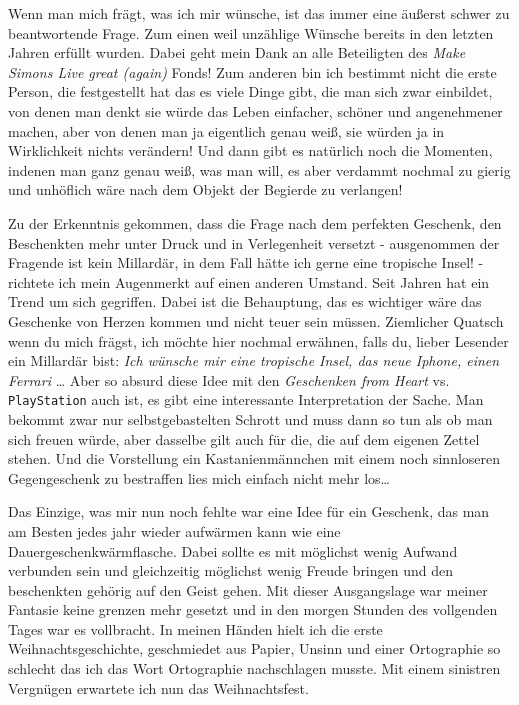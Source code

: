 \documentclass[11pt]{article}
\begin{document}
\noindent Wenn man mich frägt, was ich mir wünsche, ist das immer eine
äußerst schwer zu beantwortende Frage. Zum einen weil unzählige
Wünsche bereits in den letzten Jahren erfüllt wurden. Dabei geht mein
Dank an alle Beteiligten des \emph{Make Simons Live great (again)} Fonds!
Zum anderen bin ich bestimmt nicht die erste Person, die festgestellt
hat das es viele Dinge gibt, die man sich zwar einbildet, von denen
man denkt sie würde das Leben einfacher, schöner und angenehmener
machen, aber von denen man ja eigentlich genau weiß, sie würden ja in
Wirklichkeit nichts verändern! Und dann gibt es natürlich noch die
Momenten, indenen man ganz genau weiß, was man will, es aber
verdammt nochmal zu gierig und unhöflich wäre nach dem Objekt der
Begierde zu verlangen! \newline

\noindent Zu der Erkenntnis gekommen, dass die Frage nach dem
perfekten Geschenk, den Beschenkten mehr unter Druck und in
Verlegenheit versetzt - ausgenommen der Fragende ist kein Millardär,
in dem Fall hätte ich gerne eine tropische Insel! - richtete ich mein
Augenmerkt auf einen anderen Umstand. Seit Jahren hat ein Trend um
sich gegriffen. Dabei ist die Behauptung, das es wichtiger wäre das
Geschenke von Herzen kommen und nicht teuer sein müssen. Ziemlicher
Quatsch wenn du mich frägst, ich möchte hier nochmal erwähnen, falls
du, lieber Lesender ein Millardär bist: 
\emph{Ich wünsche mir eine tropische Insel, das neue Iphone, einen Ferrari} 
 \dots{} \newline
\noindent Aber so absurd diese Idee mit den \emph{Geschenken from Heart}
vs. \texttt{PlayStation} auch ist, es gibt eine interessante Interpretation
der Sache. Man bekommt zwar nur selbstgebastelten Schrott und muss
dann so tun als ob man sich freuen würde, aber dasselbe gilt auch für
die, die auf dem eigenen Zettel stehen. Und die Vorstellung ein
Kastanienmännchen mit einem noch sinnloseren Gegengeschenk zu
bestraffen lies mich einfach nicht mehr los\dots{}\newline

\noindent Das Einzige, was mir nun noch fehlte war eine Idee für ein
Geschenk, das man am Besten jedes jahr wieder aufwärmen kann wie eine
Dauergeschenkwärmflasche. Dabei sollte es mit möglichst wenig Aufwand
verbunden sein und gleichzeitig möglichst wenig Freude bringen und den
beschenkten gehörig auf den Geist gehen. Mit dieser Ausgangslage war
meiner Fantasie keine grenzen mehr gesetzt und in den morgen Stunden
des vollgenden Tages war es vollbracht. In meinen Händen hielt ich die
erste Weihnachtsgeschichte, geschmiedet aus Papier, Unsinn und einer
Ortographie so schlecht das ich das Wort Ortographie nachschlagen
musste. Mit einem sinistren Vergnügen erwartete ich nun das
Weihnachtsfest. \newline
\end{document}
